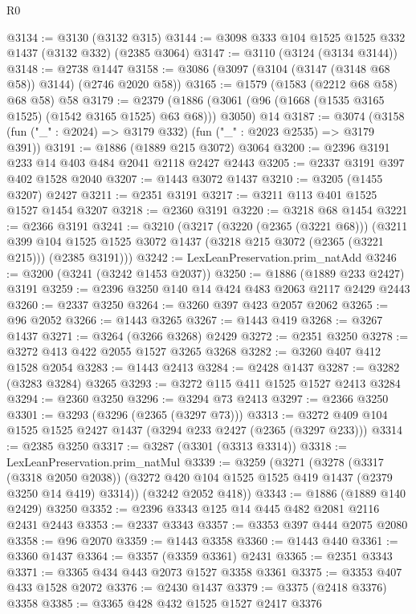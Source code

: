 \begin{lexlean}{R0}
\begin{coremodule}
@3134 := @3130 (@3132 @315)
@3144 := @3098 @333 @104 @1525 @1525 @332 @1437 (@3132 @332) (@2385 @3064)
@3147 := @3110 (@3124 (@3134 @3144))
@3148 := @2738 @1447
@3158 := @3086 (@3097 (@3104 (@3147 (@3148 @68 @58)) @3144) (@2746 @2020 @58))
@3165 := @1579 (@1583 (@2212 @68 @58) @68 @58) @58
@3179 := @2379
    (@1886 (@3061 (@96 (@1668 (@1535 @3165 @1525) (@1542 @3165 @1525) @63 @68))) @3050)
    @14
@3187 := @3074 (@3158 (fun ("_" : @2024) => @3179 @332) (fun ("_" : @2023 @2535) => @3179 @391))
@3191 := @1886 (@1889 @215 @3072) @3064
@3200 := @2396 @3191 @233 @14 @403 @484 @2041 @2118 @2427 @2443
@3205 := @2337 @3191 @397 @402 @1528 @2040
@3207 := @1443 @3072 @1437
@3210 := @3205 (@1455 @3207) @2427
@3211 := @2351 @3191
@3217 := @3211 @113 @401 @1525 @1527 @1454 @3207
@3218 := @2360 @3191
@3220 := @3218 @68 @1454
@3221 := @2366 @3191
@3241 := @3210
    (@3217
      (@3220 (@2365 (@3221 @68)))
      (@3211
        @399
        @104
        @1525
        @1525
        @3072
        @1437
        (@3218 @215 @3072 (@2365 (@3221 @215)))
        (@2385 @3191)))
@3242 := LexLeanPreservation.prim_natAdd
@3246 := @3200 (@3241 (@3242 @1453 @2037))
@3250 := @1886 (@1889 @233 @2427) @3191
@3259 := @2396 @3250 @140 @14 @424 @483 @2063 @2117 @2429 @2443
@3260 := @2337 @3250
@3264 := @3260 @397 @423 @2057 @2062
@3265 := @96 @2052
@3266 := @1443 @3265
@3267 := @1443 @419
@3268 := @3267 @1437
@3271 := @3264 (@3266 @3268) @2429
@3272 := @2351 @3250
@3278 := @3272 @413 @422 @2055 @1527 @3265 @3268
@3282 := @3260 @407 @412 @1528 @2054
@3283 := @1443 @2413
@3284 := @2428 @1437
@3287 := @3282 (@3283 @3284) @3265
@3293 := @3272 @115 @411 @1525 @1527 @2413 @3284
@3294 := @2360 @3250
@3296 := @3294 @73 @2413
@3297 := @2366 @3250
@3301 := @3293 (@3296 (@2365 (@3297 @73)))
@3313 := @3272 @409 @104 @1525 @1525 @2427 @1437 (@3294 @233 @2427 (@2365 (@3297 @233)))
@3314 := @2385 @3250
@3317 := @3287 (@3301 (@3313 @3314))
@3318 := LexLeanPreservation.prim_natMul
@3339 := @3259
    (@3271
      (@3278
        (@3317 (@3318 @2050 @2038))
        (@3272 @420 @104 @1525 @1525 @419 @1437 (@2379 @3250 @14 @419) @3314))
      (@3242 @2052 @418))
@3343 := @1886 (@1889 @140 @2429) @3250
@3352 := @2396 @3343 @125 @14 @445 @482 @2081 @2116 @2431 @2443
@3353 := @2337 @3343
@3357 := @3353 @397 @444 @2075 @2080
@3358 := @96 @2070
@3359 := @1443 @3358
@3360 := @1443 @440
@3361 := @3360 @1437
@3364 := @3357 (@3359 @3361) @2431
@3365 := @2351 @3343
@3371 := @3365 @434 @443 @2073 @1527 @3358 @3361
@3375 := @3353 @407 @433 @1528 @2072
@3376 := @2430 @1437
@3379 := @3375 (@2418 @3376) @3358
@3385 := @3365 @428 @432 @1525 @1527 @2417 @3376

\end{coremodule}
\end{lexlean}

